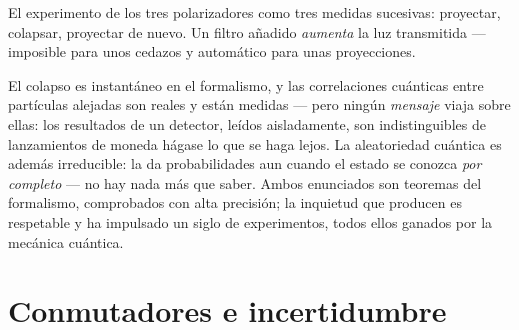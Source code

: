 \begin{omfigure}

{\small El experimento de los tres polarizadores como tres medidas
sucesivas: proyectar, colapsar, proyectar de nuevo. Un filtro añadido
\emph{aumenta} la luz transmitida --- imposible para unos cedazos y
automático para unas proyecciones.}
\end{omfigure}

\begin{remark}\label{rem:b3:quantum-formalism:nosignal}
El colapso es instantáneo en el formalismo, y las correlaciones cuánticas
entre partículas alejadas son reales y están medidas --- pero ningún
\emph{mensaje} viaja sobre ellas: los resultados de un detector, leídos
aisladamente, son indistinguibles de lanzamientos de moneda hágase lo que se
haga lejos. La aleatoriedad cuántica es además irreducible: la 
da probabilidades aun cuando el estado se conozca \emph{por completo} ---
no hay nada más que saber. Ambos enunciados son teoremas del formalismo,
comprobados con alta precisión; la inquietud que producen es respetable y ha
impulsado un siglo de experimentos, todos ellos ganados por la mecánica
cuántica.
\end{remark}

\section{Conmutadores e incertidumbre}

